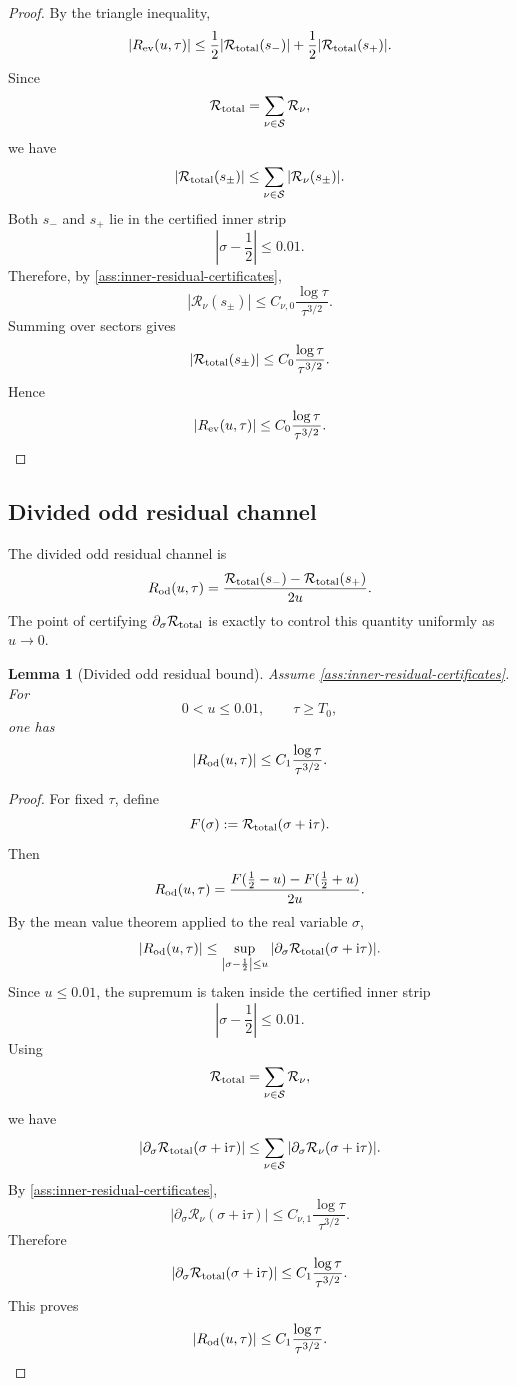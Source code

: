 \documentclass[11pt]{article}
\newtheorem{lemma}[theorem]{Lemma}
\newcommand{\ii}{\mathrm{i}}
\newcommand{\Rtot}{\mathcal R_{\rm total}}
\newcommand{\Czero}{C_0}
\newcommand{\Cone}{C_1}
\begin{document}
\begin{proof}
By the triangle inequality,
\[
        |R_{\rm ev}(u,\tau)|
        \le
        \frac12
        |\Rtot(s_-)|
        +
        \frac12
        |\Rtot(s_+)|.
\]
Since
\[
        \Rtot=\sum_{\nu\in\mathcal S}\mathcal R_\nu,
\]
we have
\[
        |\Rtot(s_\pm)|
        \le
        \sum_{\nu\in\mathcal S}
        |\mathcal R_\nu(s_\pm)|.
\]
Both \(s_-\) and \(s_+\) lie in the certified inner strip
\[
        \left|\sigma-\frac12\right|\le0.01.
\]
Therefore, by \cref{ass:inner-residual-certificates},
\[
        |\mathcal R_\nu(s_\pm)|
        \le
        C_{\nu,0}
        \frac{\log\tau}{\tau^{3/2}}.
\]
Summing over sectors gives
\[
        |\Rtot(s_\pm)|
        \le
        \Czero
        \frac{\log\tau}{\tau^{3/2}}.
\]
Hence
\[
        |R_{\rm ev}(u,\tau)|
        \le
        \Czero
        \frac{\log\tau}{\tau^{3/2}}.
\]
\end{proof}

\subsection{Divided odd residual channel}

The divided odd residual channel is
\[
        R_{\rm od}(u,\tau)
        =
        \frac{\Rtot(s_-)-\Rtot(s_+)}{2u}.
\]
The point of certifying \(\partial_\sigma\Rtot\) is exactly to control this
quantity uniformly as \(u\to0\).

\begin{lemma}[Divided odd residual bound]
\label{lem:odd-residual-bound}
Assume \cref{ass:inner-residual-certificates}.  For
\[
        0<u\le0.01,
        \qquad
        \tau\ge T_0,
\]
one has
\[
        |R_{\rm od}(u,\tau)|
        \le
        \Cone
        \frac{\log\tau}{\tau^{3/2}}.
\]
\end{lemma}

\begin{proof}
For fixed \(\tau\), define
\[
        F(\sigma):=\Rtot(\sigma+\ii\tau).
\]
Then
\[
        R_{\rm od}(u,\tau)
        =
        \frac{
        F(\frac12-u)-F(\frac12+u)
        }{2u}.
\]
By the mean value theorem applied to the real variable \(\sigma\),
\[
        |R_{\rm od}(u,\tau)|
        \le
        \sup_{\left|\sigma-\frac12\right|\le u}
        |\partial_\sigma\Rtot(\sigma+\ii\tau)|.
\]
Since \(u\le0.01\), the supremum is taken inside the certified inner strip
\[
        \left|\sigma-\frac12\right|\le0.01.
\]
Using
\[
        \Rtot=\sum_{\nu\in\mathcal S}\mathcal R_\nu,
\]
we have
\[
        |\partial_\sigma\Rtot(\sigma+\ii\tau)|
        \le
        \sum_{\nu\in\mathcal S}
        |\partial_\sigma\mathcal R_\nu(\sigma+\ii\tau)|.
\]
By \cref{ass:inner-residual-certificates},
\[
        |\partial_\sigma\mathcal R_\nu(\sigma+\ii\tau)|
        \le
        C_{\nu,1}
        \frac{\log\tau}{\tau^{3/2}}.
\]
Therefore
\[
        |\partial_\sigma\Rtot(\sigma+\ii\tau)|
        \le
        \Cone
        \frac{\log\tau}{\tau^{3/2}}.
\]
This proves
\[
        |R_{\rm od}(u,\tau)|
        \le
        \Cone
        \frac{\log\tau}{\tau^{3/2}}.
\]
\end{proof}
\end{document}
